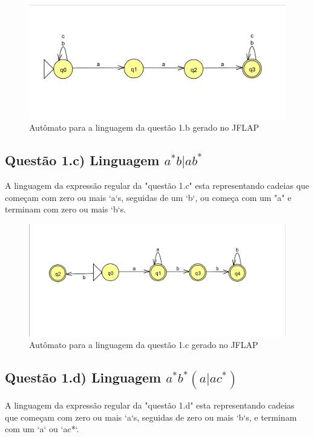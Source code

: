 \documentclass[12pt]{article}
\begin{document}
\begin{figure}[H]
\centering
\includegraphics[width=1\textwidth]{questao1/output/questao 2 automatos.png} 
\caption{Autômato para a linguagem da questão 1.b gerado no JFLAP}
\label{fig:regexExplanation}
\end{figure}

\subsection{Questão 1.c) Linguagem \(a^*b | ab^*
\)}

A linguagem da expressão regular da "questão 1.c" esta representando cadeias que começam com zero ou mais `a`s, seguidas de um `b`, ou começa com um "a" e terminam com zero ou mais `b`s.

\begin{figure}[H]
\centering
\includegraphics[width=1\textwidth]{questao1/output/questao 3 automatos.png} 
\caption{Autômato para a linguagem da questão 1.c gerado no JFLAP}
\label{fig:regexExplanation}
\end{figure}

\subsection{Questão 1.d) Linguagem \(a^*b^*(a | ac^*)\)}

A linguagem da expressão regular da "questão 1.d" esta representando cadeias que começam com zero ou mais `a`s, seguidas de zero ou mais `b`s, e terminam com um `a` ou `ac*`.
\end{document}
